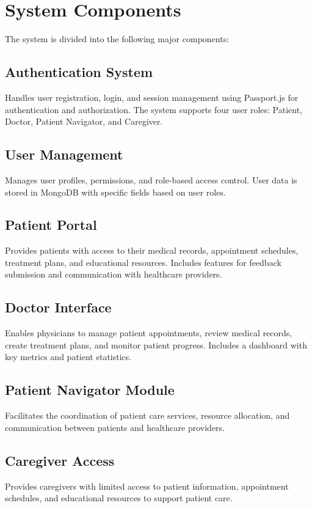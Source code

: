 \documentclass[12pt,a4paper]{report}
\begin{document}
\section{System Components}
The system is divided into the following major components:

\subsection{Authentication System}
Handles user registration, login, and session management using Passport.js for authentication and authorization. The system supports four user roles: Patient, Doctor, Patient Navigator, and Caregiver.

\subsection{User Management}
Manages user profiles, permissions, and role-based access control. User data is stored in MongoDB with specific fields based on user roles.

\subsection{Patient Portal}
Provides patients with access to their medical records, appointment schedules, treatment plans, and educational resources. Includes features for feedback submission and communication with healthcare providers.

\subsection{Doctor Interface}
Enables physicians to manage patient appointments, review medical records, create treatment plans, and monitor patient progress. Includes a dashboard with key metrics and patient statistics.

\subsection{Patient Navigator Module}
Facilitates the coordination of patient care services, resource allocation, and communication between patients and healthcare providers.

\subsection{Caregiver Access}
Provides caregivers with limited access to patient information, appointment schedules, and educational resources to support patient care.
\end{document}
